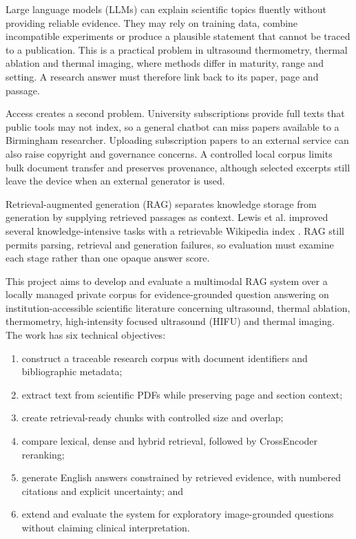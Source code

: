 \documentclass[11pt,a4paper]{article}
\begin{document}
Large language models (LLMs) can explain scientific topics fluently without providing reliable evidence. They may rely on training data, combine incompatible experiments or produce a plausible statement that cannot be traced to a publication. This is a practical problem in ultrasound thermometry, thermal ablation and thermal imaging, where methods differ in maturity, range and setting. A research answer must therefore link back to its paper, page and passage.

Access creates a second problem. University subscriptions provide full texts that public tools may not index, so a general chatbot can miss papers available to a Birmingham researcher. Uploading subscription papers to an external service can also raise copyright and governance concerns. A controlled local corpus limits bulk document transfer and preserves provenance, although selected excerpts still leave the device when an external generator is used.

Retrieval-augmented generation (RAG) separates knowledge storage from generation by supplying retrieved passages as context. Lewis et al. improved several knowledge-intensive tasks with a retrievable Wikipedia index \cite{lewis2020rag}. RAG still permits parsing, retrieval and generation failures, so evaluation must examine each stage rather than one opaque answer score.

This project aims to develop and evaluate a multimodal RAG system over a locally managed private corpus for evidence-grounded question answering on institution-accessible scientific literature concerning ultrasound, thermal ablation, thermometry, high-intensity focused ultrasound (HIFU) and thermal imaging. The work has six technical objectives:

\begin{enumerate}[leftmargin=*,itemsep=0.2em]
\item construct a traceable research corpus with document identifiers and bibliographic metadata;
\item extract text from scientific PDFs while preserving page and section context;
\item create retrieval-ready chunks with controlled size and overlap;
\item compare lexical, dense and hybrid retrieval, followed by CrossEncoder reranking;
\item generate English answers constrained by retrieved evidence, with numbered citations and explicit uncertainty; and
\item extend and evaluate the system for exploratory image-grounded questions without claiming clinical interpretation.
\end{enumerate}
\end{document}
